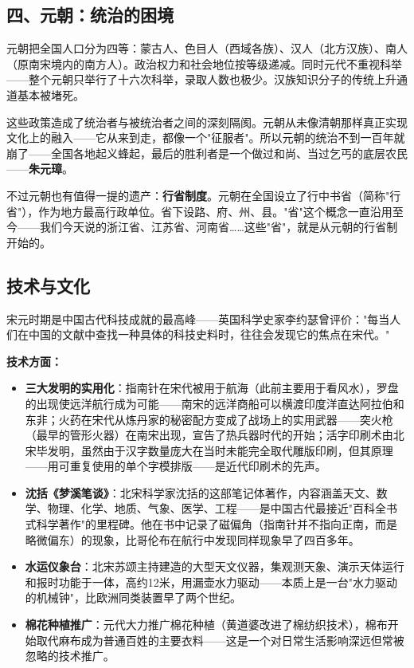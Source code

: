 \documentclass[a4paper,12pt]{ctexart}
\begin{document}
\subsection*{四、元朝：统治的困境}

元朝把全国人口分为四等：蒙古人、色目人（西域各族）、汉人（北方汉族）、南人（原南宋境内的南方人）。政治权力和社会地位按等级递减。同时元代不重视科举——整个元朝只举行了十六次科举，录取人数也极少。汉族知识分子的传统上升通道基本被堵死。

这些政策造成了统治者与被统治者之间的深刻隔阂。元朝从未像清朝那样真正实现文化上的融入——它从来到走，都像一个"征服者"。所以元朝的统治不到一百年就崩了——全国各地起义蜂起，最后的胜利者是一个做过和尚、当过乞丐的底层农民——\textbf{朱元璋}。

不过元朝也有值得一提的遗产：\textbf{行省制度}。元朝在全国设立了行中书省（简称"行省"），作为地方最高行政单位。省下设路、府、州、县。"省"这个概念一直沿用至今——我们今天说的浙江省、江苏省、河南省……这些"省"，就是从元朝的行省制开始的。

\subsection*{技术与文化}

宋元时期是中国古代科技成就的最高峰——英国科学史家李约瑟曾评价："每当人们在中国的文献中查找一种具体的科技史料时，往往会发现它的焦点在宋代。"

\textbf{技术方面：}
\begin{itemize}
  \item \textbf{三大发明的实用化}：指南针在宋代被用于航海（此前主要用于看风水），罗盘的出现使远洋航行成为可能——南宋的远洋商船可以横渡印度洋直达阿拉伯和东非；火药在宋代从炼丹家的秘密配方变成了战场上的实用武器——突火枪（最早的管形火器）在南宋出现，宣告了热兵器时代的开始；活字印刷术由北宋毕发明，虽然由于汉字数量庞大在当时未能完全取代雕版印刷，但其原理——用可重复使用的单个字模排版——是近代印刷术的先声。
  \item \textbf{沈括《梦溪笔谈》}：北宋科学家沈括的这部笔记体著作，内容涵盖天文、数学、物理、化学、地质、气象、医学、工程——是中国古代最接近"百科全书式科学著作"的里程碑。他在书中记录了磁偏角（指南针并不指向正南，而是略微偏东）的现象，比哥伦布在航行中发现同样现象早了四百多年。
  \item \textbf{水运仪象台}：北宋苏颂主持建造的大型天文仪器，集观测天象、演示天体运行和报时功能于一体，高约12米，用漏壶水力驱动——本质上是一台"水力驱动的机械钟"，比欧洲同类装置早了两个世纪。
  \item \textbf{棉花种植推广}：元代大力推广棉花种植（黄道婆改进了棉纺织技术），棉布开始取代麻布成为普通百姓的主要衣料——这是一个对日常生活影响深远但常被忽略的技术推广。
\end{itemize}
\end{document}
